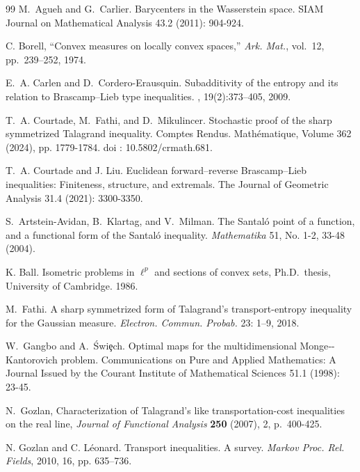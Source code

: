 \documentclass[10pt]{article}
\begin{document}
{\small
\begin{thebibliography}{99}
 \setlength{\itemsep}{1mm}
    \setlength{\parskip}{0em}
     M.~Agueh and G.~Carlier. Barycenters in the Wasserstein space. SIAM Journal on Mathematical Analysis 43.2 (2011): 904-924.

  C. Borell, ``Convex measures on locally convex spaces,'' \emph{Ark. Mat.}, vol.~12, pp.~239--252, 1974.


    
E.~A. Carlen and D.~Cordero-Erausquin.
\newblock Subadditivity of the entropy and its relation to {B}rascamp--{L}ieb
  type inequalities.
, 19(2):373--405, 2009.

 T.~A. Courtade,  M.~Fathi, and  D.~Mikulincer. Stochastic proof of the sharp symmetrized Talagrand inequality. Comptes Rendus. Math\'ematique, Volume 362 (2024), pp. 1779-1784. doi : 10.5802/crmath.681.

T.~A. Courtade and J. Liu.  Euclidean forward–reverse Brascamp–Lieb inequalities: Finiteness, structure, and extremals. The Journal of Geometric Analysis 31.4 (2021): 3300-3350.

 S.~Artstein-Avidan, B.~Klartag, and V.~Milman.
The Santaló point of a function, and a functional form of the Santaló inequality. 
\textit{Mathematika }51, No. 1-2, 33-48 (2004). 

 K. Ball. Isometric problems in $\ell^p$ and sections of convex sets, Ph.D.~thesis, University of Cambridge. 1986. 
 
 

 M.~Fathi. A sharp symmetrized form of Talagrand’s transport-entropy inequality for the Gaussian measure. \textit{Electron. Commun. Probab.} 23: 1--9, 2018.  

 

 W.~Gangbo  and A.~\'{S}wi\c{e}ch. Optimal maps for the multidimensional Monge‐-Kantorovich problem. Communications on Pure and Applied Mathematics: A Journal Issued by the Courant Institute of Mathematical Sciences 51.1 (1998): 23-45.

N.~Gozlan,  Characterization of {T}alagrand's like transportation-cost
  inequalities on the real line, \emph{Journal of Functional Analysis}
  \textbf{250} (2007),   2, p.~400-425.
  
 N. Gozlan and C. L\'eonard. Transport inequalities. A survey. \textit{Markov Proc. Rel. Fields}, 2010, 16, pp. 635--736.


\end{thebibliography}}
\end{document}
